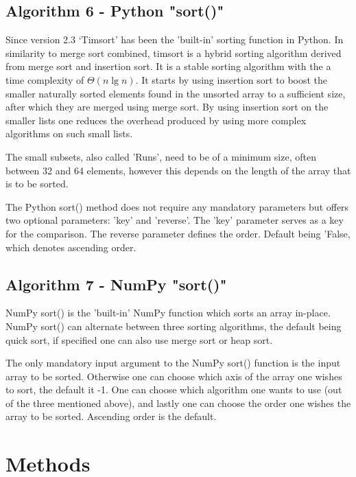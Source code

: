 \documentclass[sigconf, nonacm, natbib, screen, balance=False]{acmart}
\begin{document}
\subsection{Algorithm 6 - Python "sort()" }\label{sec:algo6}

Since version 2.3 ‘Timsort’ has been the 'built-in' sorting function in Python. In similarity to merge sort combined, timsort is a hybrid sorting algorithm derived from merge sort and insertion sort. 
It is a stable sorting algorithm with the a time complexity of $\Theta(n\lg n)$. It starts by using insertion sort to boost the smaller naturally sorted elements found in the unsorted array to a sufficient size, after which they are merged using merge sort. By using insertion sort on the smaller lists one reduces the overhead produced by using more complex algorithms on such small lists. 

The small subsets, also called 'Runs', need to be of a minimum size, often between 32 and 64 elements, however this depends on the length of the array that is to be sorted. 

The Python sort() method does not require any mandatory parameters but offers two optional parameters: 'key' and 'reverse'. The 'key' parameter serves as a key for the comparison. The reverse parameter defines the order. Default being 'False, which denotes ascending order.  

\subsection{Algorithm 7 - NumPy "sort()" }\label{sec:algo7}

NumPy sort() is the 'built-in' NumPy function which sorts an array in-place. NumPy sort() can alternate between three sorting algorithms, the default being quick sort, if specified one can also use merge sort or heap sort. 

The only mandatory input argument to the NumPy sort() function is the input array to be sorted. Otherwise one can choose which axis of the array one wishes to sort, the default it -1. One can choose which algorithm one wants to use (out of the three mentioned above), and lastly one can choose the order one wishes the array to be sorted. Ascending order is the default.

\section{Methods}\label{sec:methods}
\end{document}
